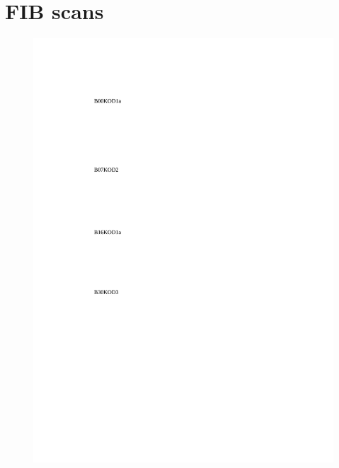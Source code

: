 \clearpage

\section{\ac{FIB} scans}

\begin{figure}[htbp]
	\begin{center}
		\includegraphics[scale=0.7]{Appendices/Figures/FIBScans/FibScans}
		\caption{}
		\label{Fig:App:FibScans}
	\end{center}
\end{figure}

